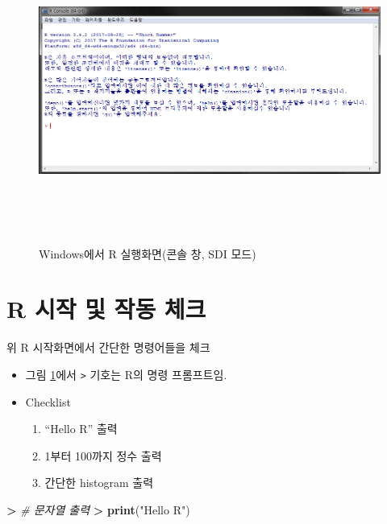 \documentclass[12pt,a4paper]{book}
\newenvironment{Shaded}{\begin{snugshade}}{\end{snugshade}}
\newcommand{\KeywordTok}[1]{\textcolor[rgb]{0.13,0.29,0.53}{\textbf{#1}}}
\newcommand{\StringTok}[1]{\textcolor[rgb]{0.31,0.60,0.02}{#1}}
\newcommand{\CommentTok}[1]{\textcolor[rgb]{0.56,0.35,0.01}{\textit{#1}}}
\newcommand{\OperatorTok}[1]{\textcolor[rgb]{0.81,0.36,0.00}{\textbf{#1}}}
\newcommand{\ErrorTok}[1]{\textcolor[rgb]{0.64,0.00,0.00}{\textbf{#1}}}
\newcommand{\NormalTok}[1]{#1}
\providecommand{\tightlist}{%
  \setlength{\itemsep}{0pt}\setlength{\parskip}{0pt}}
\theoremstyle{definition}
\theoremstyle{definition}
\theoremstyle{definition}
\theoremstyle{remark}
\begin{document}
\begin{figure}[H]
{
  \centering
  \includegraphics[width = 15cm, height = 10cm]{Figures/Rgui.png}
  \caption[Windows에서 R 실행화면(SDI)]{Windows에서 R 실행화면(콘솔 창, SDI 모드)}\label{fig:R-install-15}
}
\end{figure}

\section{R 시작 및 작동 체크}\label{r----}

위 R 시작화면에서 간단한 명령어들을 체크

\begin{itemize}
\tightlist
\item
  그림 \ref{fig:R-install-15}에서 \texttt{\textgreater{}} 기호는 R의
  명령 프롬프트임.
\item
  Checklist

  \begin{enumerate}
  \def\labelenumi{\arabic{enumi})}
  \tightlist
  \item
    ``Hello R'' 출력
  \item
    1부터 100까지 정수 출력
  \item
    간단한 histogram 출력
  \end{enumerate}
\end{itemize}

\begin{Shaded}
\begin{Highlighting}[]
\OperatorTok{>}\StringTok{ }\CommentTok{# 문자열 출력}
\ErrorTok{>}\StringTok{ }\KeywordTok{print}\NormalTok{(}\StringTok{"Hello R"}\NormalTok{)}
\end{Highlighting}
\end{Shaded}
\end{document}
